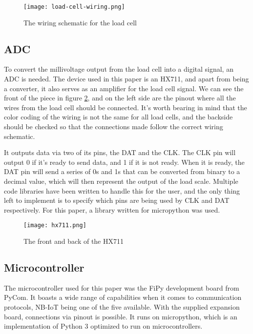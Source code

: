 \begin{figure}[h]
	\centering
	\texttt{[image: load-cell-wiring.png]}
	\caption{The wiring schematic for the load cell}
	\label{fig:wiring}
\end{figure}


\subsection{ADC}
To convert the millivoltage output from the load cell into a digital signal, an ADC is needed. The device used in this paper is an HX711, and apart from being a converter, it also serves as an amplifier for the load cell signal. We can see the front of the piece in figure \ref{fig:hx711}, and on the left side are the pinout where all the wires from the load cell should be connected. It's worth bearing in mind that the color coding of the wiring is not the same for all load cells, and the backside should be checked so that the connections made follow the correct wiring schematic. 

It outputs data via two of its pins, the DAT and the CLK. The CLK pin will output 0 if it's ready to send data, and 1 if it is not ready. When it is ready, the DAT pin will send  a series of 0s and 1s that can be converted from binary to a decimal value, which will then represent the output of the load scale.\cite{hx711-datasheet} Multiple code libraries have been written to handle this for the user, and the only thing left to implement is to specify which pins are being used by CLK and DAT respectively. For this paper, a library written for micropython was used.\cite{hx711-lopy}

\begin{figure}[h]
	\centering
	\texttt{[image: hx711.png]}
	\caption{The front and back of the HX711}
	\label{fig:hx711}
\end{figure}


\subsection{Microcontroller}
The microcontroller used for this paper was the FiPy development board from PyCom. It boasts a wide range of capabilities when it comes to communication protocols, NB-IoT being one of the five available.\cite{fipy-docs} With the supplied expansion board, connections via pinout is possible. It runs on micropython, which is an implementation of Python 3 optimized to run on microcontrollers.\cite{micropython}

